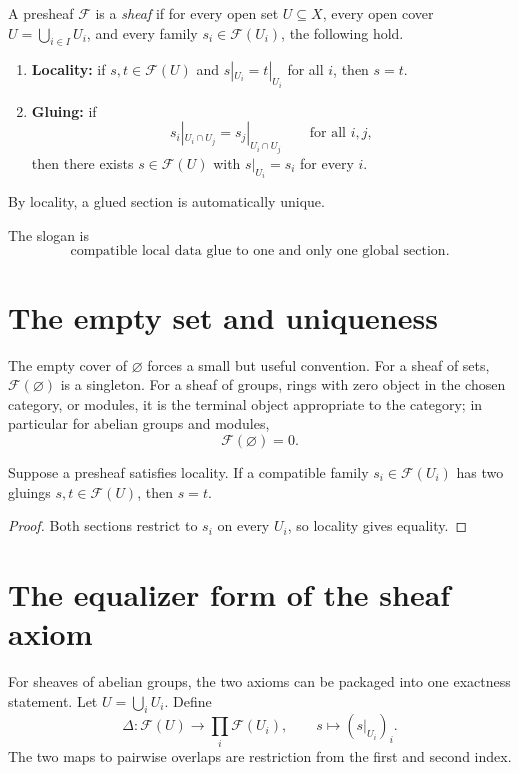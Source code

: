 \begin{definition}[Sheaf]
A presheaf $\mathcal F$ is a \emph{sheaf} if for every open set $U\subseteq X$, every open
cover $U=\bigcup_{i\in I}U_i$, and every family $s_i\in\mathcal F(U_i)$, the following hold.
\begin{enumerate}
\item \textbf{Locality:} if $s,t\in\mathcal F(U)$ and $s|_{U_i}=t|_{U_i}$ for all $i$, then
$s=t$.
\item \textbf{Gluing:} if
\[
s_i|_{U_i\cap U_j}=s_j|_{U_i\cap U_j}
\qquad\text{for all }i,j,
\]
then there exists $s\in\mathcal F(U)$ with $s|_{U_i}=s_i$ for every $i$.
\end{enumerate}
By locality, a glued section is automatically unique.
\end{definition}



The slogan is
\[
\boxed{\text{compatible local data glue to one and only one global section}.}
\]

\section{The empty set and uniqueness}

The empty cover of $\varnothing$ forces a small but useful convention.  For a sheaf of sets,
$\mathcal F(\varnothing)$ is a singleton.  For a sheaf of groups, rings with zero object in
the chosen category, or modules, it is the terminal object appropriate to the category; in
particular for abelian groups and modules,
\[
\mathcal F(\varnothing)=0.
\]

\begin{proposition}
Suppose a presheaf satisfies locality.  If a compatible family $s_i\in\mathcal F(U_i)$ has
two gluings $s,t\in\mathcal F(U)$, then $s=t$.
\end{proposition}
\begin{proof}
Both sections restrict to $s_i$ on every $U_i$, so locality gives equality.
\end{proof}

\section{The equalizer form of the sheaf axiom}

For sheaves of abelian groups, the two axioms can be packaged into one exactness statement.
Let $U=\bigcup_iU_i$.  Define
\[
\Delta:\mathcal F(U)\longrightarrow\prod_i\mathcal F(U_i),
\qquad s\longmapsto(s|_{U_i})_i.
\]
The two maps to pairwise overlaps are restriction from the first and second index.

